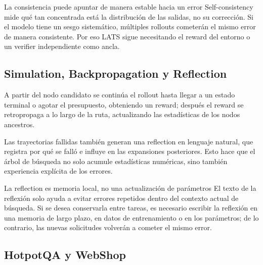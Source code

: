 \documentclass[a4paper]{article}
\begin{document}
\begin{warningbox}{La consistencia puede apuntar de manera estable hacia un error}
Self-consistency mide qué tan concentrada está la distribución de las salidas, no su corrección. Si el modelo tiene un sesgo sistemático, múltiples rollouts cometerán el mismo error de manera consistente. Por eso LATS sigue necesitando el reward del entorno o un verifier independiente como ancla.
\end{warningbox}

\subsection{Simulation, Backpropagation y Reflection}

A partir del nodo candidato se continúa el rollout hasta llegar a un estado terminal o agotar el presupuesto, obteniendo un reward; después el reward se retropropaga a lo largo de la ruta, actualizando las estadísticas de los nodos ancestros.



Las trayectorias fallidas también generan una reflection en lenguaje natural, que registra por qué se falló e influye en las expansiones posteriores. Esto hace que el árbol de búsqueda no solo acumule estadísticas numéricas, sino también experiencia explícita de los errores.

\begin{knowledgebox}{La reflection es memoria local, no una actualización de parámetros}
El texto de la reflexión solo ayuda a evitar errores repetidos dentro del contexto actual de búsqueda. Si se desea conservarla entre tareas, es necesario escribir la reflexión en una memoria de largo plazo, en datos de entrenamiento o en los parámetros; de lo contrario, las nuevas solicitudes volverán a cometer el mismo error.
\end{knowledgebox}

\subsection{HotpotQA y WebShop}

\end{document}
